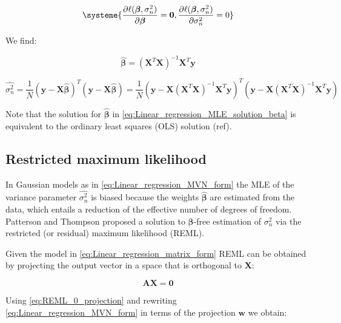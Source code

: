 \begin{equation} \label{eq:Linear_regression_MLE_system}
\systeme{
    \dfrac{\partial \ell(\boldsymbol{\beta}, \sigma_n^2)}{\partial \boldsymbol{\beta}} = \mathbf{0},
    \dfrac{\partial \ell(\boldsymbol{\beta}, \sigma_n^2)}{\partial \sigma_n^2} = 0
    }
\end{equation}

We find:

\begin{equation} \label{eq:Linear_regression_MLE_solution_beta}
\hat{\boldsymbol{\beta}} = (\mathbf{X}^T\mathbf{X})^{-1}\mathbf{X}^T\mathbf{y} 
\end{equation}

\begin{equation} \label{eq:Linear_regression_MLE_solution_sigma}
 \hat{\sigma_n^2} = \frac{1}{N}(\mathbf{y}-\mathbf{X}\hat{\boldsymbol{\beta}})^T(\mathbf{y}-\mathbf{X}\hat{\boldsymbol{\beta}}) = \frac{1}{N}(\mathbf{y}-\mathbf{X}(\mathbf{X}^T\mathbf{X})^{-1}\mathbf{X}^T\mathbf{y})^T(\mathbf{y}-\mathbf{X}(\mathbf{X}^T\mathbf{X})^{-1}\mathbf{X}^T\mathbf{y}) 
\end{equation}

Note that the solution for $\hat{\boldsymbol{\beta}}$ in \eqref{eq:Linear_regression_MLE_solution_beta} is equivalent to the ordinary least squares (OLS) solution (ref).


\subsection{Restricted maximum likelihood}

In Gaussian models as in \eqref{eq:Linear_regression_MVN_form} the MLE of the variance parameter $\hat{\sigma_n^2}$ is biased because the weights $\hat{\boldsymbol{\beta}}$ are estimated from the data, which entails a reduction of the effective number of degrees of freedom.
Patterson and Thompson \cite{patterson1971recovery} proposed a solution to $\boldsymbol{\beta}$-free estimation of $\sigma_n^2$ via the restricted (or residual) maximum likelihood (REML).

Given the model in \eqref{eq:Linear_regression_matrix_form} REML can be obtained by projecting the output vector in a space that is orthogonal to $\mathbf{X}$:

\begin{equation}\label{eq:REML_0_projection}
    \mathbf{A}\mathbf{X} = \mathbf{0}
\end{equation}

Using \eqref{eq:REML_0_projection} and rewriting \eqref{eq:Linear_regression_MVN_form} in terms of the projection $\mathbf{w}$ we obtain:

